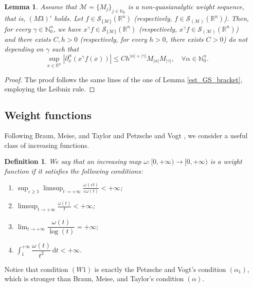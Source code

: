\documentclass[11pt,reqno]{amsart}
\numberwithin{equation}{section}
\newtheorem{definition}[theorem]{Definition}
\newtheorem{lemma}[theorem]{Lemma}
\newcommand{\R}{{\mathbb{R}}} %
\newcommand{\caS}{{\mathcal{S}}}
\newcommand{\Mj}{{\{M_j\}_{j\in\mathbb{N}_0}}} %
\newcommand{\M}{{\mathcal{M}}} %
\begin{document}
\begin{lemma}\label{lemma_poly_GS}
	Assume that $\M=\Mj$ is a non-quasianalytic weight sequence, that is, $(M3)'$ holds. Let $f\in\caS_{\{\M\}}(\R^n)$ (respectively, $f\in\caS_{(\M)}(\R^n)$). Then, for every $\gamma\in\mathbb{N}_0^n$, we have $x^\gamma f \in\caS_{\{\M\}}(\R^n)$ (respectively, $x^\gamma f \in\caS_{(\M)}(\R^n)$) and there exists $C,h>0$ (respectively, for every $h>0$, there exists $C>0$) do not depending on $\gamma$ such that
	\[\sup_{x\in\R^n}|\partial_x^\alpha(x^\gamma f(x))|\leq Ch^{|\alpha|+|\gamma|}M_{|\alpha|}M_{|\gamma|},\quad\forall \alpha\in\mathbb{N}_0^n.\]
\end{lemma}
%
\begin{proof}
	The proof follows the same lines of the one of Lemma \ref{est_GS_bracket}, employing the Leibniz rule.
\end{proof}




\subsection{Weight functions}

Following Braun, Meise, and Taylor \cite{BMT1990} and Petzsche and Vogt \cite{PV1984}, we consider a useful class of increasing functions.

\begin{definition}
	We say that an increasing map $\omega:[0,+\infty)\to [0,+\infty)$ is a weight function if it satisfies the following conditions:
	\begin{enumerate}
		\item[$(W1)$] $\displaystyle\sup_{\varepsilon\geq 1}\limsup_{t\to+\infty}\frac{\omega(\varepsilon t)}{\varepsilon\omega(t)} < +\infty$;
		
		\item[$(W2)$] $\displaystyle \limsup_{t\to+\infty}\frac{\omega(t)}{t}<+\infty$;
		
		\item[$(W3)$] $\displaystyle\lim_{t\to +\infty}\dfrac{\omega(t)}{\log(t)}=+\infty;$
		
		\item[$(W4)$] $\displaystyle\int_1^{+\infty}\dfrac{\omega(t)}{t^2}\,\mathrm{d}t<+\infty$.
	\end{enumerate}
\end{definition}

Notice that condition $(W1)$ is exactly the Petzsche and Vogt's condition $(\alpha_1)$, which is stronger than Braun, Meise, and Taylor's condition $(\alpha)$.
\end{document}

